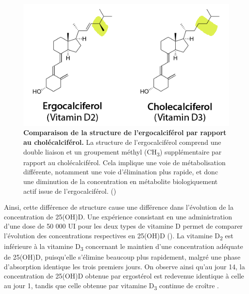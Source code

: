 \documentclass[
  a4paper,
  DIV=11,
  numbers=noendperiod,
  listof=totoc]{scrreprt}
\begin{document}
\begin{figure}
\includegraphics{figures/ergo_vs_chole.png} 
\caption[Comparaison de la structure de l'ergocalciférol par rapport au cholécalciférol.]
{\textbf{Comparaison de la structure de l'ergocalciférol par rapport au cholécalciférol.} La structure de l'ergocalciférol comprend une double liaison et un groupement méthyl (CH\textsubscript{3}) supplémentaire par rapport au cholécalciférol. Cela implique une voie de métabolisation différente, notamment une voie d'élimination plus rapide, et donc une diminution de la concentration en métabolite biologiquement actif issue de l'ergocalciférol. (\cite{Houghton.2006})}
\label{fig:ergo-struc}
\end{figure}

Ainsi, cette différence de structure cause une différence dans
l'évolution de la concentration de 25(OH)D. Une expérience consistant en
une administration d'une dose de 50 000 UI pour les deux types de
vitamine D permet de comparer l'évolution des concentrations respectives
en 25(OH)D (). La vitamine D\textsubscript{2} est
inférieure à la vitamine D\textsubscript{3} concernant le maintien d'une
concentration adéquate de 25(OH)D, puisqu'elle s'élimine beaucoup plus
rapidement, malgré une phase d'absorption identique les trois premiers
jours. On observe ainsi qu'au jour 14, la concentration de 25(OH)D
obtenue par ergostérol est redevenue identique à celle au jour 1, tandis
que celle obtenue par vitamine D\textsubscript{3} continue de croître
\autocite{Armas.2004}.
\end{document}
